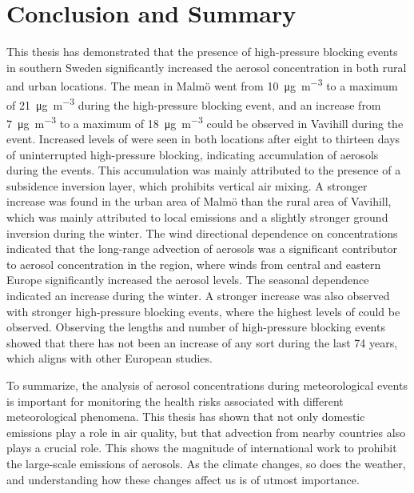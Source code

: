 \newpage
\section{Conclusion and Summary}
This thesis has demonstrated that the presence of high-pressure blocking events in southern Sweden significantly increased the aerosol concentration in both rural and urban locations. The mean \PM in Malmö went from \SI{10}{\micro\gram\per\meter\cubed} to a maximum of \SI{21}{\micro\gram\per\meter\cubed} during the high-pressure blocking event, and an increase from \SI{7}{\micro\gram\per\meter\cubed} to a maximum of \SI{18}{\micro\gram\per\meter\cubed} could be observed in Vavihill during the event. Increased levels of \PM were seen in both locations after eight to thirteen days of uninterrupted high-pressure blocking, indicating accumulation of aerosols during the events. This accumulation was mainly attributed to the presence of a subsidence inversion layer, which prohibits vertical air mixing. A stronger increase was found in the urban area of Malmö than the rural area of Vavihill, which was mainly attributed to local emissions and a slightly stronger ground inversion during the winter. The wind directional dependence on \PM concentrations indicated that the long-range advection of aerosols was a significant contributor to aerosol concentration in the region, where winds from central and eastern Europe significantly increased the aerosol levels. The seasonal dependence indicated an increase during the winter. A stronger increase was also observed with stronger high-pressure blocking events, where the highest levels of \PM could be observed. Observing the lengths and number of high-pressure blocking events showed that there has not been an increase of any sort during the last 74 years, which aligns with other European studies.

To summarize, the analysis of aerosol concentrations during meteorological events is important for monitoring the health risks associated with different meteorological phenomena. This thesis has shown that not only domestic emissions play a role in air quality, but that advection from nearby countries also plays a crucial role. This shows the magnitude of international work to prohibit the large-scale emissions of aerosols. As the climate changes, so does the weather, and understanding how these changes affect us is of utmost importance.

